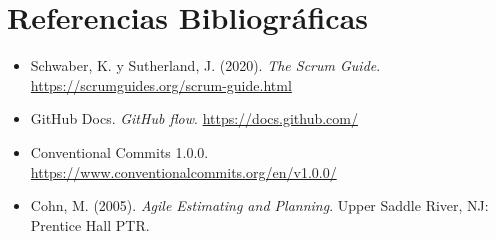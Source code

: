 \documentclass[11pt,a4paper]{article}
\begin{document}
\section{Referencias Bibliográficas}

\begin{itemize}[leftmargin=1.5cm]
    \item Schwaber, K. y Sutherland, J. (2020). \textit{The Scrum Guide}. \url{https://scrumguides.org/scrum-guide.html}
    \item GitHub Docs. \textit{GitHub flow}. \url{https://docs.github.com/}
    \item Conventional Commits 1.0.0. \url{https://www.conventionalcommits.org/en/v1.0.0/}
    \item Cohn, M. (2005). \textit{Agile Estimating and Planning}. Upper Saddle River, NJ: Prentice Hall PTR.
\end{itemize}
\end{document}
